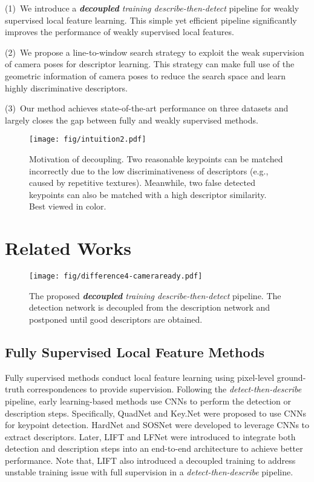 \documentclass[10pt,twocolumn,letterpaper]{article}
\begin{document}
(1)~We introduce a \textit{\textbf{decoupled} training describe-then-detect} pipeline  for weakly supervised local feature learning. This simple yet efficient pipeline significantly improves the performance of weakly supervised local features. 

(2)~We propose a line-to-window search strategy to exploit the weak supervision of camera poses for descriptor learning. This strategy can make full use of the geometric information of camera poses to reduce the search space and learn highly discriminative descriptors.

{(3)~Our method achieves state-of-the-art performance on three datasets and largely closes the gap between fully and weakly supervised methods.}

\begin{figure}[t]
    \centering
    \texttt{[image: fig/intuition2.pdf]}
    \caption{Motivation of decoupling. Two reasonable keypoints can be matched incorrectly due to the low discriminativeness of descriptors (e.g., caused by repetitive textures). Meanwhile, two false detected keypoints can also be matched with a high descriptor similarity. Best viewed in color.}
    \label{fig_intuition}
\end{figure}


\section{Related Works}

\begin{figure*}
    \centering
    \texttt{[image: fig/difference4-cameraready.pdf]}
    \caption{The proposed \textit{\textbf{decoupled} training describe-then-detect} pipeline. The detection network is decoupled from the description network and postponed until good descriptors are obtained.}
    \label{fig_pipeline}
\end{figure*}

\subsection{Fully Supervised Local Feature Methods}
Fully supervised methods conduct local feature learning using pixel-level ground-truth correspondences to provide supervision.
Following the \textit{detect-then-describe} pipeline, early learning-based methods \cite{savinov2017quad, barroso2019key,NIPS2017_831caa1b, tian2019sosnet,ebel2019beyond, luo2019contextdesc} use CNNs to perform the detection or description steps. Specifically, 
QuadNet \cite{savinov2017quad} and Key.Net \cite{barroso2019key} were proposed to use CNNs for keypoint detection. 
HardNet \cite{NIPS2017_831caa1b} and SOSNet \cite{tian2019sosnet} were developed to leverage CNNs to extract descriptors. 
Later, LIFT \cite{yi2016lift} and LFNet \cite{ono2018lf} were introduced to integrate both {detection} and {description} steps into an end-to-end architecture to achieve better performance. Note that, LIFT \cite{yi2016lift} also introduced a decoupled training to address unstable training issue with full supervision in a \textit{detect-then-describe} pipeline.
\end{document}
